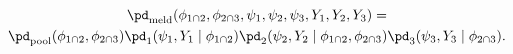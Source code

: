 \begin{multline}
  \pd_{\text{meld}} (\phi_{1 \cap 2}, \phi_{2 \cap 3}, \psi_{1}, \psi_{2}, \psi_{3}, Y_{1}, Y_{2}, Y_{3}) = \\    
    \pd_{\text{pool}}(\phi_{1 \cap 2}, \phi_{2 \cap 3})
    \pd_{1} (\psi_{1}, Y_{1} \mid \phi_{1 \cap 2})
    \pd_{2} (\psi_{2}, Y_{2} \mid \phi_{1 \cap 2}, \phi_{2 \cap 3})
    \pd_{3} (\psi_{3}, Y_{3} \mid \phi_{2 \cap 3}).
  \label{eqn:melded-model-cond}
\end{multline}